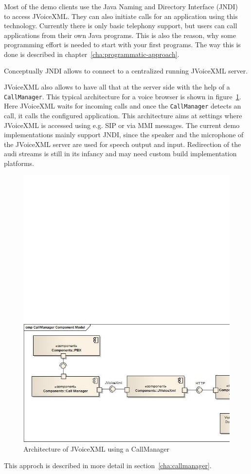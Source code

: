 \documentclass[11pt,a4paper]{book}
\begin{document}
Most of the demo clients use the Java Naming and Directory Interface
(JNDI)~\cite{sun:jndi} to access JVoiceXML. They can also initiate calls for an application using this 
technology. Currently there is only basic telephony support, but users can call 
applications from their own Java programs. This is also the reason, why some
programming effort is needed to start with your first programs. The way this is
done is described in chapter~\ref{cha:programmatic-approach}.

Conceptually JNDI allows to connect to a centralized running JVoiceXML 
server.

JVoiceXML also allows to have all that at the server side with the help of a
\lstinline{CallManager}.
This typical architecture for a voice browser is shown in
figure~\ref{fig:server-architecture}. Here JVoiceXML waits for incoming
calls and once the \lstinline{CallManager} detects an call, it calls the
configured application. This architecture aims at settings where JVoiceXML
is accessed using e.g. SIP or via MMI messages. 
The current demo implementations mainly support JNDI, since the speaker and the
microphone of the JVoiceXML server are used for speech output and input.
Redirection of the audi streams is still in its infancy and may need
custom build implementation platforms.
\begin{figure}
\includegraphics[width=\linewidth]{server-architecture.jpg}
\caption{Architecture of JVoiceXML using a CallManager}
\label{fig:server-architecture}
\end{figure}
This approch is described in more detail in section~\ref{cha:callmanager}.
\end{document}
